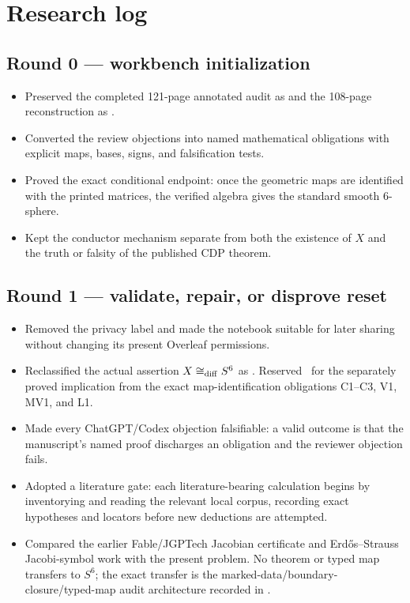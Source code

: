 \section{Research log}

\subsection*{Round 0 --- workbench initialization}

\begin{itemize}[leftmargin=1.8em]
\item Preserved the completed 121-page annotated audit as  and the 108-page reconstruction as .
\item Converted the review objections into named mathematical obligations with explicit maps, bases, signs, and falsification tests.
\item Proved the exact conditional endpoint: once the geometric maps are identified with the printed matrices, the verified algebra gives the standard smooth $6$-sphere.
\item Kept the conductor mechanism separate from both the existence of $X$ and the truth or falsity of the published CDP theorem.
\end{itemize}

\subsection*{Round 1 --- validate, repair, or disprove reset}

\begin{itemize}[leftmargin=1.8em]
\item Removed the privacy label and made the notebook suitable for later sharing without changing its present Overleaf permissions.
\item Reclassified the actual assertion $X\cong_{\rm diff}S^6$ as \Open. Reserved \Conditional\ for the separately proved implication from the exact map-identification obligations C1--C3, V1, MV1, and L1.
\item Made every ChatGPT/Codex objection falsifiable: a valid outcome is that the manuscript's named proof discharges an obligation and the reviewer objection fails.
\item Adopted a literature gate: each literature-bearing calculation begins by inventorying and reading the relevant local corpus, recording exact hypotheses and locators before new deductions are attempted.
\item Compared the earlier Fable/JGPTech Jacobian certificate and Erd\H{o}s--Strauss Jacobi-symbol work with the present problem. No theorem or typed map transfers to $S^6$; the exact transfer is the marked-data/boundary-closure/typed-map audit architecture recorded in .
\end{itemize}

